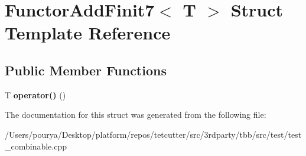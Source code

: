\hypertarget{structFunctorAddFinit7}{}\section{Functor\+Add\+Finit7$<$ T $>$ Struct Template Reference}
\label{structFunctorAddFinit7}
\subsection*{Public Member Functions}
\begin{DoxyCompactItemize}
\item 
\hypertarget{structFunctorAddFinit7_aa007f972a2c3ba8cfd30feee8c665e97}{}T {\bfseries operator()} ()\label{structFunctorAddFinit7_aa007f972a2c3ba8cfd30feee8c665e97}

\end{DoxyCompactItemize}


The documentation for this struct was generated from the following file\+:\begin{DoxyCompactItemize}
\item 
/\+Users/pourya/\+Desktop/platform/repos/tetcutter/src/3rdparty/tbb/src/test/test\+\_\+combinable.\+cpp\end{DoxyCompactItemize}
